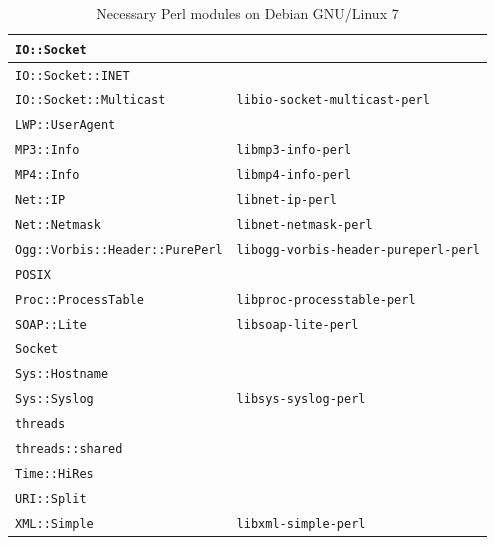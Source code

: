 \documentclass[a4paper,oneside,10pt]{report}
\begin{document}
\begin{table}
\begin{tabular}{|p{15em}|p{18em}|}
		\hline
		\verb|IO::Socket| 										& \\
		\hline
		\verb|IO::Socket::INET| 							& \\
		\hline
		\verb|IO::Socket::Multicast| 					& \verb|libio-socket-multicast-perl| \\
		\hline
		\verb|LWP::UserAgent| 								& \\
		\hline
		\verb|MP3::Info| 											& \verb|libmp3-info-perl| \\
		\hline
		\verb|MP4::Info| 											& \verb|libmp4-info-perl| \\
		\hline
		\verb|Net::IP| 												& \verb|libnet-ip-perl| \\
		\hline
		\verb|Net::Netmask| 									& \verb|libnet-netmask-perl| \\
		\hline
		\verb|Ogg::Vorbis::Header::PurePerl| 	& \verb|libogg-vorbis-header-pureperl-perl| \\
		\hline
		\verb|POSIX| 													& \\
		\hline
		\verb|Proc::ProcessTable| 						& \verb|libproc-processtable-perl| \\
		\hline
		\verb|SOAP::Lite| 										& \verb|libsoap-lite-perl| \\
		\hline
		\verb|Socket| 												& \\
		\hline
		\verb|Sys::Hostname| 									& \\
		\hline
		\verb|Sys::Syslog| 										& \verb|libsys-syslog-perl| \\
		\hline
		\verb|threads| 												& \\
		\hline
		\verb|threads::shared| 								& \\
		\hline
		\verb|Time::HiRes|										& \\
		\hline
		\verb|URI::Split| 										& \\
		\hline
		\verb|XML::Simple| 										& \verb|libxml-simple-perl| \\
		\hline
	\end{tabular}
	\caption{Necessary Perl modules on Debian GNU/Linux 7}
	\label{tab:NecessaryPerlModulesDebian7}
\end{table}
\end{document}
